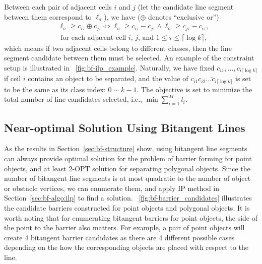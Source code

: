 Between each pair of adjacent cells $i$ and $ j$ (let the candidate line segment between them correspond to $\ell_\sigma$), we have ($\oplus$ denotes ``exclusive or'')
\begin{equation}
\begin{split}
    &\ell_\sigma \geq c_{i\tau} \oplus c_{j\tau}  \Leftrightarrow \ell_\sigma \geq c_{i\tau} - c_{j\tau} \wedge \ell_\sigma\geq c_{j\tau} - c_{i\tau}, \\
    &\text{  for each adjacent cell $i$, $j$, and $1\leq \tau \leq \lceil \log k \rceil$},
\end{split}
\end{equation}
which means if two adjacent cells belong to different classes, then the line segment candidate between them must be selected. 
An example of the constraint setup is illustrated in ~\ref{fig:bf-ilp_example}.
Naturally, we have fixed $c_{i1},\dots,c_{i\lceil \log k\rceil}$ if ceil $i$ contains an object to be separated, 
and the value of $\overline{c_{i1}c_{i2}\dots c_{i\lceil \log k\rceil}}$ is set to be the same as its class index: $0\sim k-1$.
The objective is set to minimize the total number of line candidates selected, i.e., $\min \sum_{i=1}^{M} l_i$.

\subsection{Near-optimal Solution Using Bitangent Lines}
As the results in Section~\ref{sec:bf-structure} show, using bitangent line segments 
can always provide optimal solution for the problem of barrier forming for point objects, 
and at least 2-OPT
solution for separating polygonal objects. 
Since the number of bitangent line segments is at 
most quadratic to the number of object or obstacle vertices, 
we can enumerate them, and apply IP method in Section~\ref{sec:bf-algo:ilp} to find a solution. 
~\ref{fig:bf-barrier_candidates} illustrates the candidate barriers constructed for point objects and polygonal objects.
It is worth noting that for enumerating bitangent barriers for point objects, the side of the point to the barrier also matters. 
For example, a pair of point objects will create $4$ bitangent barrier candidates as there are 4 different possible cases depending on the how the corresponding objects are placed with respect to the line. 

